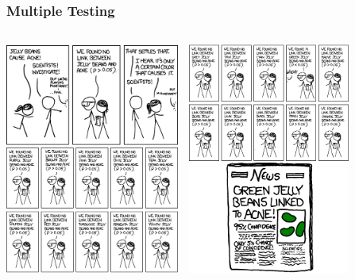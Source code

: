 \documentclass[xcolor={dvipsnames}]{beamer}
\begin{document}
\frame
{
\frametitle{Multiple Testing}

\vspace{-.75em}

\begin{columns}
\begin{column}{1\textwidth}
\hspace*{-1em}\includegraphics[width=2.25in]{stuff/significant1.png}$\quad$\includegraphics[width=2.09in]{stuff/significant2.png}
\end{column}
\end{columns}


}
\end{document}
